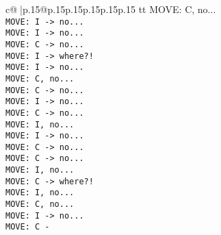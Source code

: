 \documentclass{article}
\begin{document}
{\begin{supertabular}{c@{$\;$}|p{.15\linewidth}@{}p{.15\linewidth}p{.15\linewidth}p{.15\linewidth}p{.15\linewidth}p{.15\linewidth}}
{{{tt  MOVE: C, no...\\ \tt  MOVE: I -> no...\\ \tt  MOVE: I -> no...\\ \tt  MOVE: C -> no...\\ \tt  MOVE: I -> where?!\\ \tt  MOVE: I -> no...\\ \tt  MOVE: C, no...\\ \tt  MOVE: C -> no...\\ \tt  MOVE: I -> no...\\ \tt  MOVE: C -> no...\\ \tt  MOVE: I, no...\\ \tt  MOVE: I -> no...\\ \tt  MOVE: C -> no...\\ \tt  MOVE: C -> no...\\ \tt  MOVE: I, no...\\ \tt  MOVE: C -> where?!\\ \tt  MOVE: I, no...\\ \tt  MOVE: C, no...\\ \tt  MOVE: I -> no...\\ \tt  MOVE: C -}}}
\end{supertabular}}
\end{document}
